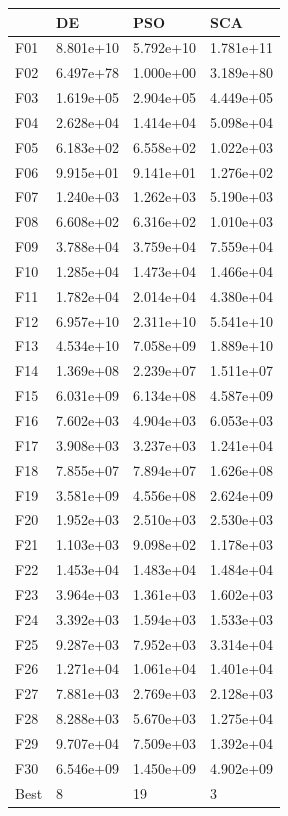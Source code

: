 \begin{tabular}{llll}
\toprule
{} &         DE &        PSO &        SCA \\
\midrule
F01  &  8.801e+10 &  5.792e+10 &  1.781e+11 \\
F02  &  6.497e+78 &  1.000e+00 &  3.189e+80 \\
F03  &  1.619e+05 &  2.904e+05 &  4.449e+05 \\
F04  &  2.628e+04 &  1.414e+04 &  5.098e+04 \\
F05  &  6.183e+02 &  6.558e+02 &  1.022e+03 \\
F06  &  9.915e+01 &  9.141e+01 &  1.276e+02 \\
F07  &  1.240e+03 &  1.262e+03 &  5.190e+03 \\
F08  &  6.608e+02 &  6.316e+02 &  1.010e+03 \\
F09  &  3.788e+04 &  3.759e+04 &  7.559e+04 \\
F10  &  1.285e+04 &  1.473e+04 &  1.466e+04 \\
F11  &  1.782e+04 &  2.014e+04 &  4.380e+04 \\
F12  &  6.957e+10 &  2.311e+10 &  5.541e+10 \\
F13  &  4.534e+10 &  7.058e+09 &  1.889e+10 \\
F14  &  1.369e+08 &  2.239e+07 &  1.511e+07 \\
F15  &  6.031e+09 &  6.134e+08 &  4.587e+09 \\
F16  &  7.602e+03 &  4.904e+03 &  6.053e+03 \\
F17  &  3.908e+03 &  3.237e+03 &  1.241e+04 \\
F18  &  7.855e+07 &  7.894e+07 &  1.626e+08 \\
F19  &  3.581e+09 &  4.556e+08 &  2.624e+09 \\
F20  &  1.952e+03 &  2.510e+03 &  2.530e+03 \\
F21  &  1.103e+03 &  9.098e+02 &  1.178e+03 \\
F22  &  1.453e+04 &  1.483e+04 &  1.484e+04 \\
F23  &  3.964e+03 &  1.361e+03 &  1.602e+03 \\
F24  &  3.392e+03 &  1.594e+03 &  1.533e+03 \\
F25  &  9.287e+03 &  7.952e+03 &  3.314e+04 \\
F26  &  1.271e+04 &  1.061e+04 &  1.401e+04 \\
F27  &  7.881e+03 &  2.769e+03 &  2.128e+03 \\
F28  &  8.288e+03 &  5.670e+03 &  1.275e+04 \\
F29  &  9.707e+04 &  7.509e+03 &  1.392e+04 \\
F30  &  6.546e+09 &  1.450e+09 &  4.902e+09 \\
Best &          8 &         19 &          3 \\
\bottomrule
\end{tabular}
